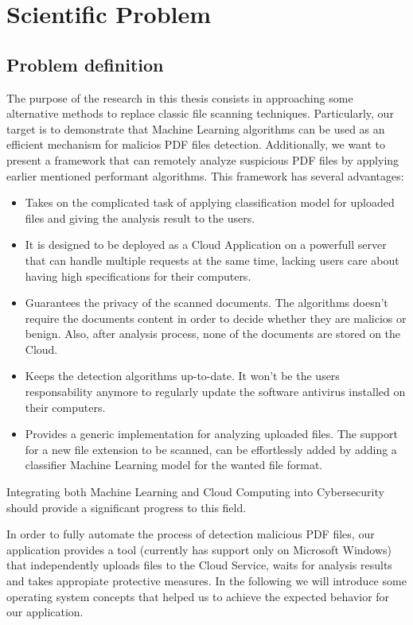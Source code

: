 \chapter{Scientific Problem}
\label{section:scientificProblem}

\section{Problem definition}
\label{section:problemDefinition}
The purpose of the research in this thesis consists in approaching some alternative methods to replace classic file scanning techniques. Particularly, our target is to demonstrate that Machine Learning algorithms can be used as an efficient mechanism for malicios PDF files detection. Additionally, we want to present a framework that can remotely analyze suspicious PDF files by applying earlier mentioned performant algorithms. This framework has several advantages: 
\begin{itemize}
    \item Takes on the complicated task of applying classification model for uploaded files and giving the analysis result to the users.
    \item It is designed to be deployed as a Cloud Application on a powerfull server that can handle multiple requests at the same time, lacking users care about having high specifications for their computers.
    \item Guarantees the privacy of the scanned documents. The algorithms doesn't require the documents content in order to decide whether they are malicios or benign. Also, after analysis process, none of the documents are stored on the Cloud.
    \item Keeps the detection algorithms up-to-date. It won't be the users responsability anymore to regularly update the software antivirus installed on their computers. 
    \item Provides a generic implementation for analyzing uploaded files. The support for a new file extension to be scanned, can be effortlessly added by adding a classifier Machine Learning model for the wanted file format.
\end{itemize}
Integrating both Machine Learning and Cloud Computing into Cybersecurity should provide a significant progress to this field. \par


In order to fully automate the process of detection malicious PDF files, our application provides a tool (currently has support only on Microsoft Windows) that independently uploads files to the Cloud Service, waits for analysis results and takes appropiate protective measures. In the following we will introduce some operating system concepts that helped us to achieve the expected behavior for our application.

